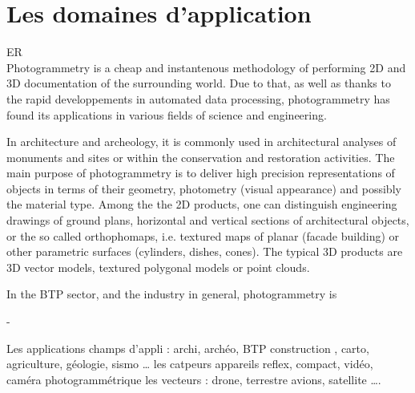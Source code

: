 \section{Les domaines d'application}
ER\\
%
Photogrammetry is a cheap and instantenous methodology of performing 2D and 3D documentation of the surrounding world. Due to that, as well as thanks to the rapid developpements in automated data processing, photogrammetry has found its applications in various fields of science and engineering.\par
%
In architecture and archeology, it is commonly used in architectural analyses of monuments and sites or within the conservation and restoration activities. The main purpose of photogrammetry is to deliver high precision representations of objects in terms of their geometry, photometry (visual appearance) and possibly the material type. Among the the 2D products, one can distinguish engineering drawings of ground plans, horizontal and vertical sections of architectural objects, or the so called orthophomaps, i.e. textured maps of planar (facade building) or other parametric surfaces (cylinders, dishes, cones). The typical 3D products are 3D vector models, textured polygonal models or point clouds.\par 
%
In the BTP sector, and the industry in general, photogrammetry is 


- 

Les applications
champs d'appli : archi, archéo, BTP construction , carto, agriculture, géologie, sismo …
les catpeurs appareils reflex, compact, vidéo, caméra photogrammétrique
les vecteurs : drone, terrestre avions, satellite ….
